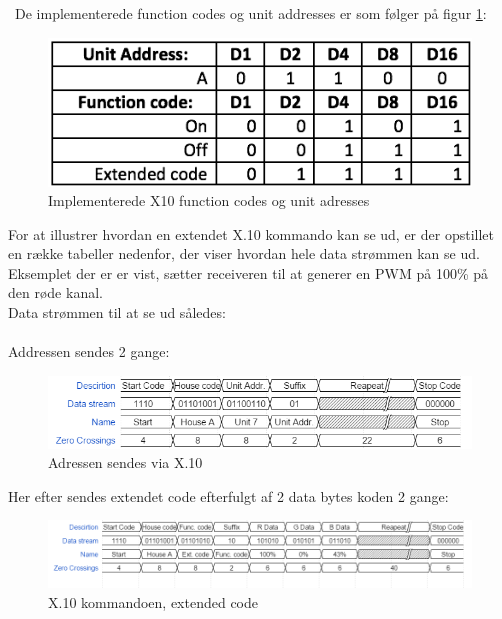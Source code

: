 \documentclass[oneside]{memoir}
\begin{document}
\\\\\
De implementerede function codes og unit addresses er som følger på figur \ref{fig:X10-1}:
\begin{figure}[H]
\centering
\includegraphics[scale=0.8]{"billeder til latex/X10-1"}
\caption{Implementerede X10 function codes og unit adresses}
\label{fig:X10-1}
\end{figure}
For at illustrer hvordan en extendet X.10 kommando kan se ud, er der opstillet en række tabeller nedenfor, der viser hvordan hele data strømmen kan se ud.\\
Eksemplet der er er vist, sætter receiveren til at generer en PWM på 100\% på den røde kanal. \\
Data strømmen til at se ud således:
\\\\

Addressen sendes 2 gange:
\begin{figure}[H]
\centering
\includegraphics[scale=0.5]{"billeder til latex/X10 unit adderes"}
\caption{Adressen sendes via X.10}
\label{fig:X10-2}
\end{figure}
Her efter sendes extendet code efterfulgt af 2 data bytes koden 2 gange:
\begin{figure}[H]
\centering
\includegraphics[scale=0.5]{"billeder til latex/X10 Extendet code"}
\caption{X.10 kommandoen, extended code}
\label{fig:X10-3}
\end{figure}
\end{document}
